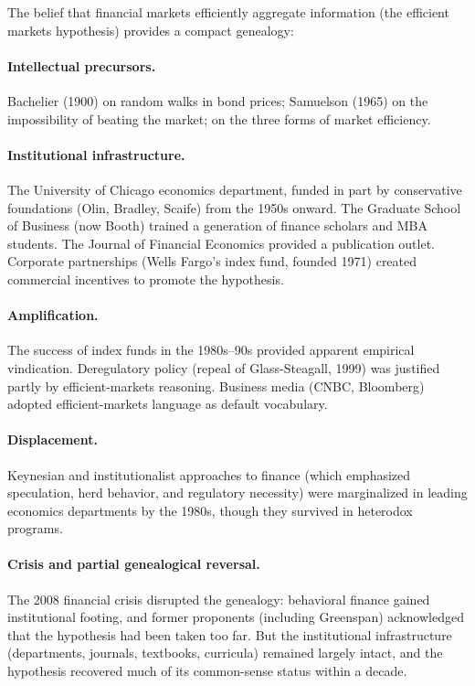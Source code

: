 \begin{example}
\label{ex:genealogy-emh}
The belief that financial markets efficiently aggregate information (the efficient markets hypothesis) provides a compact genealogy:

\paragraph{Intellectual precursors.}
Bachelier (1900) on random walks in bond prices; Samuelson (1965) on the impossibility of beating the market; \textcite{fama1970} on the three forms of market efficiency.

\paragraph{Institutional infrastructure.}
The University of Chicago economics department, funded in part by conservative foundations (Olin, Bradley, Scaife) from the 1950s onward.
The Graduate School of Business (now Booth) trained a generation of finance scholars and MBA students.
The Journal of Financial Economics provided a publication outlet.
Corporate partnerships (Wells Fargo's index fund, founded 1971) created commercial incentives to promote the hypothesis.

\paragraph{Amplification.}
The success of index funds in the 1980s--90s provided apparent empirical vindication.
Deregulatory policy (repeal of Glass-Steagall, 1999) was justified partly by efficient-markets reasoning.
Business media (CNBC, Bloomberg) adopted efficient-markets language as default vocabulary.

\paragraph{Displacement.}
Keynesian and institutionalist approaches to finance (which emphasized speculation, herd behavior, and regulatory necessity) were marginalized in leading economics departments by the 1980s, though they survived in heterodox programs.

\paragraph{Crisis and partial genealogical reversal.}
The 2008 financial crisis disrupted the genealogy: behavioral finance gained institutional footing, and former proponents (including Greenspan) acknowledged that the hypothesis had been taken too far.
But the institutional infrastructure (departments, journals, textbooks, curricula) remained largely intact, and the hypothesis recovered much of its common-sense status within a decade.
\end{example}

